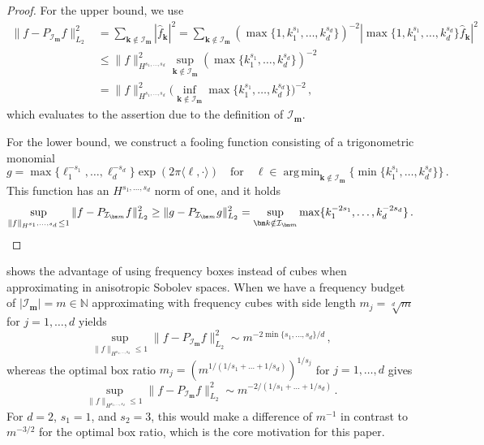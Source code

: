 \documentclass[a4paper]{scrartcl}
\numberwithin{equation}{section}
\DeclareMathOperator{\Argmin}{arg\,min}
\begin{document}
\begin{proof} For the upper bound, we use
    \begin{align*}
        \|f-P_{\mathcal I_{\bm m}}f\|_{L_2}^{2}
        &= \sum_{\bm k\notin \mathcal I_{\bm m}} |\hat f_{\bm k}|^2
        = \sum_{\bm k\notin \mathcal I_{\bm m}} (\max\{1,k_1^{s_1}, \dots, k_d^{s_d}\})^{-2} |\max\{1,k_1^{s_1}, \dots, k_d^{s_d}\}\hat f_{\bm k}|^2 \\
        &\le \|f\|_{H^{s_1, \dots, s_d}}^2 \sup_{\bm k\notin \mathcal I_{\bm m}} (\max\{k_1^{s_1}, \dots, k_d^{s_d}\})^{-2} \\
        &= \|f\|_{H^{s_1, \dots, s_d}}^2 \Big(\inf_{\bm k\notin \mathcal I_{\bm m}} \max\{k_1^{s_1}, \dots, k_d^{s_d}\}\Big)^{-2} \,,
    \end{align*}
    which evaluates to the assertion due to the definition of $\mathcal I_{\bm m}$.

    For the lower bound, we construct a fooling function consisting of a trigonometric monomial
    \begin{equation*}
        g = \max\{\ell_1^{-s_1}, \dots, \ell_d^{-s_d}\}\exp(2\pi\mathrm \langle\bm \ell,\cdot\rangle)
        \quad\text{for}\quad
        \bm \ell\in\Argmin_{\bm k\notin \mathcal I_{\bm m}}\{\min\{k_1^{s_1},\dots,k_d^{s_d}\}\} \,.
    \end{equation*}
    This function has an $H^{s_1,\dots,s_d}$ norm of one, and it holds
    \begin{equation*}
        \sup_{\|f\|_{H^{s_1, \dots, s_d}}\le 1} \|f-P_{\mathcal I_{\bm m}}f\|_{L_2}^{2}
        \ge \|g-P_{\mathcal I_{\bm m}}g\|_{L_2}^{2}
        = \sup_{\bm k\notin \mathcal I_{\bm m}} \max\{k_1^{-2s_1}, \dots, k_d^{-2s_d}\} \,. \qedhere
    \end{equation*}
\end{proof} 

 shows the advantage of using frequency boxes instead of cubes when approximating in anisotropic Sobolev spaces.
When we have a frequency budget of $|\mathcal I_{\bm m}| = m\in\mathds N$ approximating with frequency cubes with side length $m_j = \sqrt[d]{m}$ for $j=1,\dots,d$ yields
\begin{equation*}
    \sup_{\|f\|_{H^{s_1,\dots,s_d}}\le 1} \|f-P_{\mathcal I_{\bm m}} f\|_{L_2}^{2}
    \sim m^{-2\min\{s_1, \dots, s_d\}/d} \,,
\end{equation*}
whereas the optimal box ratio $m_j = (m^{1/(1/s_1+\dots+1/s_d)})^{1/s_j}$ for $j=1,\dots,d$ gives
\begin{equation*}
    \sup_{\|f\|_{H^{s_1,\dots,s_d}}\le 1} \|f-P_{\mathcal I_{\bm m}} f\|_{L_2}^{2}
    \sim m^{-2/(1/s_1+\dots+1/s_d)} \,.
\end{equation*}
For $d=2$, $s_1 = 1$, and $s_2 = 3$, this would make a difference of $m^{-1}$ in contrast to $m^{-3/2}$ for the optimal box ratio, which is the core motivation for this paper.
\end{document}
